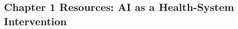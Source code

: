 \begin{refsection}
\chapter{Chapter 1 Resources: AI as a Health-System Intervention}
\label{chap:comp-ch01}



\printbibliography[heading=subbibliography,title={Chapter 1 References}]
\end{refsection}
